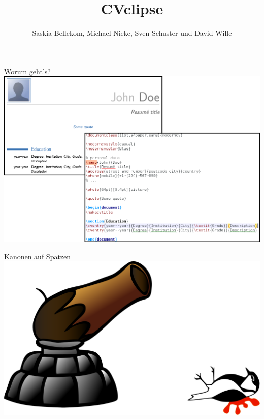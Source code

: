\documentclass[fleqn,11pt,nexus]{beamer}
\title{CVclipse}
\author{Saskia Bellekom, Michael Nieke, Sven Schuster und David Wille}
\begin{document}
\begin{frame}[plain]
\titlepage
\end{frame}

\begin{frame}{Worum geht's?}
	\centering
	\includegraphics[scale=0.3]{images/cv}
\end{frame}

\begin{frame}{Kanonen auf Spatzen}
	\centering
	\includegraphics[scale=0.3]{images/canon_bird}
\end{frame}
\end{document}

